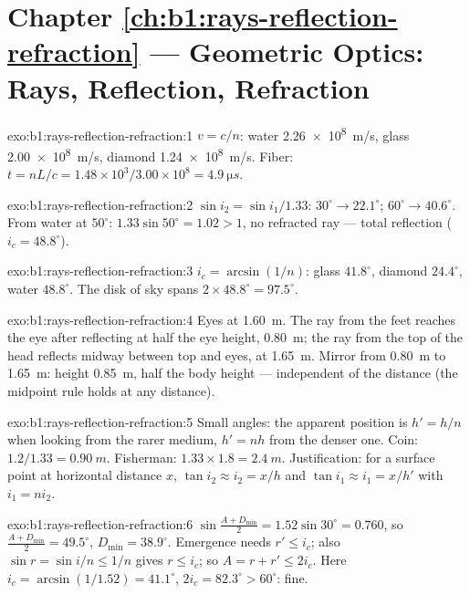 \section*{Chapter \ref{ch:b1:rays-reflection-refraction} --- Geometric Optics: Rays, Reflection, Refraction}

\begin{solution}{exo:b1:rays-reflection-refraction:1}
$v = c/n$: water \qty{2.26e8}{m/s}, glass \qty{2.00e8}{m/s}, diamond
\qty{1.24e8}{m/s}. Fiber: $t = nL/c = 1.48 \times 10^3/3.00\times10^8 =
\qty{4.9}{\micro s}$.
\end{solution}

\begin{solution}{exo:b1:rays-reflection-refraction:2}
$\sin i_2 = \sin i_1/1.33$: $30^\circ \to 22.1^\circ$; $60^\circ \to
40.6^\circ$. From water at $50^\circ$: $1.33\sin 50^\circ = 1.02 > 1$,
no refracted ray --- total reflection ($i_c = 48.8^\circ$).
\end{solution}

\begin{solution}{exo:b1:rays-reflection-refraction:3}
$i_c = \arcsin(1/n)$: glass $41.8^\circ$, diamond $24.4^\circ$, water
$48.8^\circ$. The disk of sky spans $2 \times 48.8^\circ = 97.5^\circ$.
\end{solution}

\begin{solution}{exo:b1:rays-reflection-refraction:4}
Eyes at \qty{1.60}{m}. The ray from the feet reaches the eye after
reflecting at half the eye height, \qty{0.80}{m}; the ray from the top
of the head reflects midway between top and eyes, at \qty{1.65}{m}.
Mirror from \qty{0.80}{m} to \qty{1.65}{m}: height \qty{0.85}{m}, half
the body height --- independent of the distance (the midpoint rule
holds at any distance).
\end{solution}

\begin{solution}{exo:b1:rays-reflection-refraction:5}
Small angles: the apparent position is $h' = h/n$ when looking from the
rarer medium, $h' = nh$ from the denser one. Coin: $1.2/1.33 =
\qty{0.90}{m}$. Fisherman: $1.33 \times 1.8 = \qty{2.4}{m}$. Justification:
for a surface point at horizontal distance $x$, $\tan i_2 \approx i_2 =
x/h$ and $\tan i_1 \approx i_1 = x/h'$ with $i_1 = n i_2$.
\end{solution}

\begin{solution}{exo:b1:rays-reflection-refraction:6}
$\sin\frac{A + D_{\min}}{2} = 1.52\sin 30^\circ = 0.760$, so
$\frac{A + D_{\min}}{2} = 49.5^\circ$, $D_{\min} = 38.9^\circ$.
Emergence needs $r' \leq i_c$; also $\sin r = \sin i/n \leq 1/n$ gives
$r \leq i_c$; so $A = r + r' \leq 2i_c$. Here $i_c = \arcsin(1/1.52) =
41.1^\circ$, $2i_c = 82.3^\circ > 60^\circ$: fine.
\end{solution}

